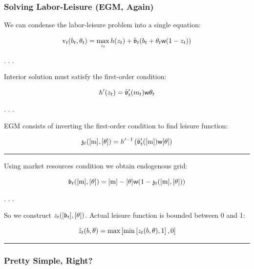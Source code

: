 \documentclass[
  letterpaper,
  DIV=11,
  numbers=noendperiod]{scrartcl}
\begin{document}
\hypertarget{solving-labor-leisure-egm-again}{%
\subsubsection{Solving Labor-Leisure (EGM,
Again)}\label{solving-labor-leisure-egm-again}}

We can condense the labor-leisure problem into a single equation:

\[\begin{equation}
\mathrm{v}_{t}(b_{t}, \theta_{t}) = \max_{ z_{t}}
  h(z_{t}) + \tilde{\mathfrak{v}}_{t}(b_{t} +
  \theta_{t} \mathsf{w} (1-z_{t}))
\end{equation}\]

. . .

Interior solution must satisfy the first-order condition:

\[\begin{equation}
h'(z_{t}) = \tilde{\mathfrak{v}}_{t}'(m_{t}) \mathsf{w} \theta_{t}
\end{equation}\]

. . .

EGM consists of inverting the first-order condition to find leisure
function:

\[\begin{equation}
\mathfrak{z}_{t}([\mathrm{m}], [\mathrm{\theta}]) = h'^{-1}\left(
  \tilde{\mathfrak{v}}_{t}'([\mathrm{m}]) \mathsf{w} [\mathrm{\theta}] \right)
\end{equation}\]

\begin{center}\rule{0.5\linewidth}{0.5pt}\end{center}

Using market resources condition we obtain endogenous grid:

\[\mathfrak{b}_{t}([\mathrm{m}], [\mathrm{\theta}]) = [\mathrm{m}] -
  [\mathrm{\theta}]\mathsf{w}(1-\mathfrak{z}_{t}([\mathrm{m}], [\mathrm{\theta}]))\]

. . .

So we construct \(z_t([\mathfrak{b}_t], [\mathrm{\theta}])\). Actual leisure
function is bounded between 0 and 1:

\[\begin{equation}
\hat{z}_{t}(b, \theta) = \max \left[ \min \left[ z_{t}(b, \theta), 1 \right], 0 \right]
\end{equation}\]

\begin{center}\rule{0.5\linewidth}{0.5pt}\end{center}

\hypertarget{pretty-simple-right}{%
\subsubsection{Pretty Simple, Right?}\label{pretty-simple-right}}
\end{document}
